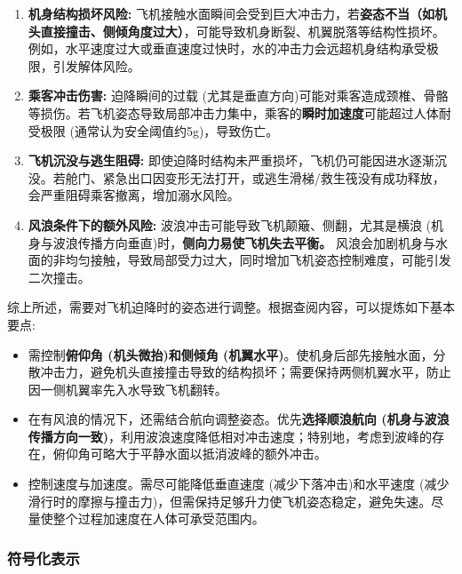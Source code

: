 \documentclass{cumcmthesis}
\begin{document}
\begin{enumerate}

\item \textbf{机身结构损坏风险:} 飞机接触水面瞬间会受到巨大冲击力，若\textbf{姿态不当（如机头直接撞击、侧倾角度过大）}，可能导致机身断裂、机翼脱落等结构性损坏。例如，水平速度过大或垂直速度过快时，水的冲击力会远超机身结构承受极限，引发解体风险。

\item \textbf{乘客冲击伤害:}   
   迫降瞬间的过载 (尤其是垂直方向)可能对乘客造成颈椎、骨骼等损伤。若飞机姿态导致局部冲击力集中，乘客的\textbf{瞬时加速度}可能超过人体耐受极限 (通常认为安全阈值约5g)，导致伤亡。

\item \textbf{飞机沉没与逃生阻碍:}   
   即使迫降时结构未严重损坏，飞机仍可能因进水逐渐沉没。若舱门、紧急出口因变形无法打开，或逃生滑梯/救生筏没有成功释放，会严重阻碍乘客撤离，增加溺水风险。

\item \textbf{风浪条件下的额外风险:}  
波浪冲击可能导致飞机颠簸、侧翻，尤其是横浪 (机身与波浪传播方向垂直)时，\textbf{侧向力易使飞机失去平衡。} 风浪会加剧机身与水面的非均匀接触，导致局部受力过大，同时增加飞机姿态控制难度，可能引发二次撞击。

\end{enumerate}

综上所述，需要对飞机迫降时的姿态进行调整。根据查阅内容，可以提炼如下基本要点:

\begin{itemize}
    
    \item 需控制\textbf{俯仰角 (机头微抬)和侧倾角 (机翼水平)}。使机身后部先接触水面，分散冲击力，避免机头直接撞击导致的结构损坏；需要保持两侧机翼水平，防止因一侧机翼率先入水导致飞机翻转。
    
    \item 在有风浪的情况下，还需结合航向调整姿态。优先\textbf{选择顺浪航向 (机身与波浪传播方向一致)}，利用波浪速度降低相对冲击速度；特别地，考虑到波峰的存在，俯仰角可略大于平静水面以抵消波峰的额外冲击。

    \item 控制速度与加速度。需尽可能降低垂直速度 (减少下落冲击)和水平速度 (减少滑行时的摩擦与撞击力)，但需保持足够升力使飞机姿态稳定，避免失速。尽量使整个过程加速度在人体可承受范围内。

\end{itemize}

\subsubsection{符号化表示}
\end{document}
